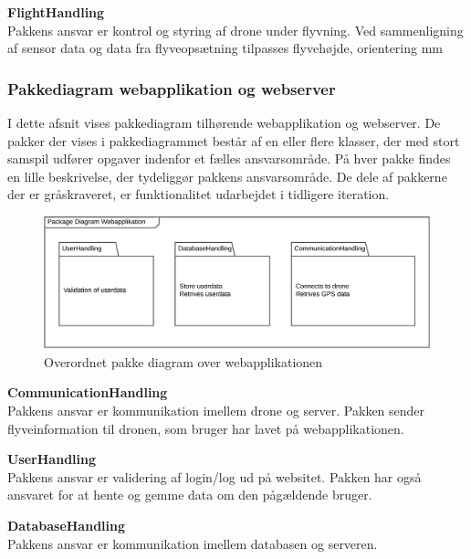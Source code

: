\textbf{FlightHandling}\\
Pakkens ansvar er kontrol og styring af drone under flyvning. Ved sammenligning af sensor data og data fra flyveopsætning tilpasses flyvehøjde, orientering mm



\newpage
\subsubsection*{Pakkediagram webapplikation og webserver}

I dette afsnit vises pakkediagram tilhørende webapplikation og webserver. De pakker der vises i pakkediagrammet består af en eller flere klasser, der med stort samspil udfører opgaver indenfor et fælles ansvarsområde. På hver pakke findes en lille beskrivelse, der tydeliggør pakkens ansvarsområde. De dele af pakkerne der er gråskraveret, er funktionalitet udarbejdet i tidligere iteration.

\begin{figure}[H]
	\centering
	\includegraphics[width=1\textwidth]{Billeder/pakke_diagrammer/iteration1_server.png}
	\vspace{-0.5cm}
	\caption{Overordnet pakke diagram over webapplikationen}
	\label{fig:iteration1_pakke_diagram_webapp}
\end{figure}

\textbf{CommunicationHandling}\\
Pakkens ansvar er kommunikation imellem drone og server. Pakken sender flyveinformation til dronen, som bruger har lavet på webapplikationen.

\textbf{UserHandling}\\
Pakkens ansvar er validering af login/log ud på websitet. Pakken har også ansvaret for at hente og gemme data om den pågældende bruger.

\textbf{DatabaseHandling}\\
Pakkens ansvar er kommunikation imellem databasen og serveren. 


\newpage

